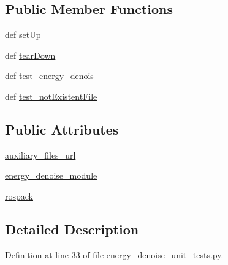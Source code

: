 \subsection*{Public Member Functions}
\begin{DoxyCompactItemize}
\item 
def \hyperlink{classenergy__denoise__unit__tests_1_1TestAudioProcessing_a44c374336e29472cc652b67ab0dada30}{set\-Up}
\item 
def \hyperlink{classenergy__denoise__unit__tests_1_1TestAudioProcessing_a55c6e949339b8570f70110a175ceec0f}{tear\-Down}
\item 
def \hyperlink{classenergy__denoise__unit__tests_1_1TestAudioProcessing_a811ed04be3321882fa8eb15be7762718}{test\-\_\-energy\-\_\-denois}
\item 
def \hyperlink{classenergy__denoise__unit__tests_1_1TestAudioProcessing_a0b6da8782f3e5ed188fae3be9a051616}{test\-\_\-not\-Existent\-File}
\end{DoxyCompactItemize}
\subsection*{Public Attributes}
\begin{DoxyCompactItemize}
\item 
\hyperlink{classenergy__denoise__unit__tests_1_1TestAudioProcessing_a90a81b0f2553ca8b64eb8b430ec0b61f}{auxiliary\-\_\-files\-\_\-url}
\item 
\hyperlink{classenergy__denoise__unit__tests_1_1TestAudioProcessing_acccf9990be3626520addd73fdbaaf4ea}{energy\-\_\-denoise\-\_\-module}
\item 
\hyperlink{classenergy__denoise__unit__tests_1_1TestAudioProcessing_a25b1514d4fd69a373b58def2b5c76719}{rospack}
\end{DoxyCompactItemize}


\subsection{Detailed Description}


Definition at line 33 of file energy\-\_\-denoise\-\_\-unit\-\_\-tests.\-py.



